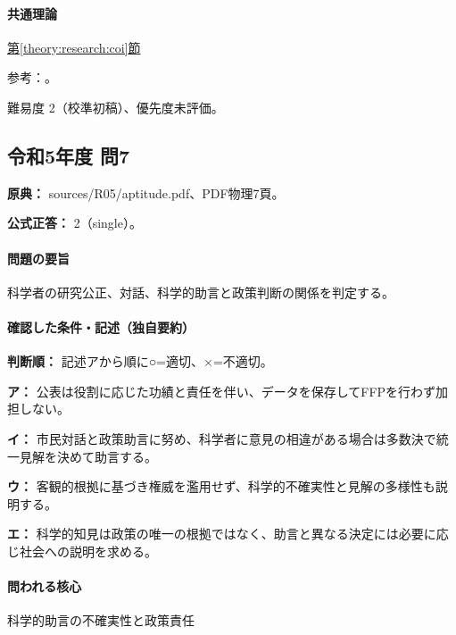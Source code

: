 \paragraph{共通理論} \hyperref[theory:research:coi]{第\ref*{theory:research:coi}節}

\par 参考：\cite{jsps_integrity2025}。

\par 難易度 2（校準初稿）、優先度未評価。

\subsection{令和5年度 問7}
\label{q:r05-reg-apt-07}

\noindent\textbf{原典：} sources/R05/aptitude.pdf、PDF物理7頁。

\textbf{公式正答：} 2（single）。

\paragraph{問題の要旨} 科学者の研究公正、対話、科学的助言と政策判断の関係を判定する。

\paragraph{確認した条件・記述（独自要約）}\mbox{}\par

\noindent\textbf{判断順：} 記述アから順に○=適切、×=不適切。\par

\noindent\textbf{ア：} 公表は役割に応じた功績と責任を伴い、データを保存してFFPを行わず加担しない。\par

\noindent\textbf{イ：} 市民対話と政策助言に努め、科学者に意見の相違がある場合は多数決で統一見解を決めて助言する。\par

\noindent\textbf{ウ：} 客観的根拠に基づき権威を濫用せず、科学的不確実性と見解の多様性も説明する。\par

\noindent\textbf{エ：} 科学的知見は政策の唯一の根拠ではなく、助言と異なる決定には必要に応じ社会への説明を求める。\par

\paragraph{問われる核心} 科学的助言の不確実性と政策責任

